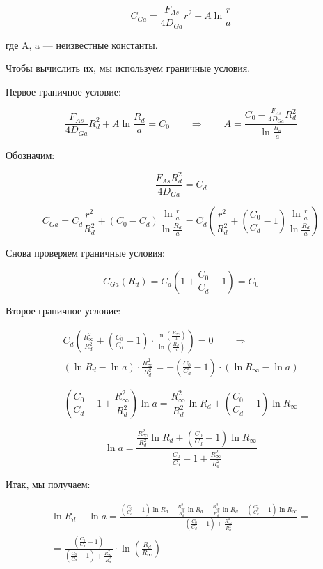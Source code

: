 \documentclass[14pt,oneside]{extarticle}
\begin{document}
\[
C_{Ga}=\frac{F_{As}}{4D_{Ga}}r^{2}+A\ln\frac{r}{a}
\]

где A, a — неизвестные константы.

Чтобы вычислить их, мы используем граничные условия.

Первое граничное условие:

\[
\frac{F_{As}}{4D_{Ga}}R_{d}^{2}+A\ln\frac{R_{d}}{a}=C_{0}\qquad\Rightarrow\qquad A=\frac{C_{0}-\frac{F_{As}}{4D_{Ga}}R_{d}^{2}}{\ln\frac{R_{d}}{a}}
\]

Обозначим:

\begin{equation}
    \frac{F_{As}R_{d}^{2}}{4D_{Ga}}=C_{d}
\end{equation}

\[
C_{Ga}=C_{d}\frac{r^{2}}{R_{d}^{2}}+\left(C_{0}-C_{d}\right)\frac{\ln\frac{r}{a}}{\ln\frac{R_{d}}{a}}=C_{d}\left(\frac{r^{2}}{R_{d}^{2}}+\left(\frac{C_{0}}{C_{d}}-1\right)\frac{\ln\frac{r}{a}}{\ln\frac{R_{d}}{a}}\right)
\]
  
Снова проверяем граничные условия:

\[
C_{Ga}\left(R_{d}\right)=C_{d}\left(1+\frac{C_{0}}{C_{d}}-1\right)=C_{0}
\]

Второе граничное условие:

\begin{multline*}
    C_{d}\left(
    \frac{R_{\infty}^{2}}{R_{d}^{2}} +
    \left(\frac{C_{0}}{C_{d}} - 1\right)
    \cdot
    \frac{\ln\left( \frac{R_{\infty}}{a} \right)}{\ln\left( \frac{R_{d}}{a} \right)}
    \right)
    = 0
    \qquad\Rightarrow\qquad \\
    \left(\ln R_{d} - \ln a\right)
    \cdot \frac{R_{\infty}^{2}}{R_{d}^{2}} =
    -\left( \frac{C_{0}}{C_{d}} - 1 \right)
    \cdot \left(\ln R_{\infty} - \ln a\right)
\end{multline*}
    

\[
\left(\frac{C_{0}}{C_{d}}-1+\frac{R_{\infty}^{2}}{R_{d}^{2}}\right)\ln a=\frac{R_{\infty}^{2}}{R_{d}^{2}}\ln R_{d}+\left(\frac{C_{0}}{C_{d}}-1\right)\ln R_{\infty}
\]

\[
\ln a=\frac{\frac{R_{\infty}^{2}}{R_{d}^{2}}\ln R_{d}+\left(\frac{C_{0}}{C_{d}}-1\right)\ln R_{\infty}}{\frac{C_{0}}{C_{d}}-1+\frac{R_{\infty}^{2}}{R_{d}^{2}}}
\]

Итак, мы получаем:

\begin{multline*}
    \ln R_{d} - \ln a =
    \frac{
    \left( \frac{C_0}{C_d} - 1 \right) \ln R_d
    + \frac{R_{\infty}^{2}}{R_d^2} \ln R_d
    - \frac{R_{\infty}^{2}}{R_d^2} \ln R_d
    - \left( \frac{C_0}{C_d} - 1 \right) \ln R_{\infty}
    }{
    \left( \frac{C_0}{C_d} - 1 \right)
    + \frac{R_{\infty}^{2}}{R_d^2}
    } = \\
    = \frac{
    \left( \frac{C_0}{C_d} - 1 \right)
    }{
    \left( \frac{C_0}{C_d} - 1 \right)
    + \frac{R_{\infty}^{2}}{R_d^2}
    }
    \cdot \ln \left( \frac{R_d}{R_{\infty}} \right)
\end{multline*}
    
\end{document}
